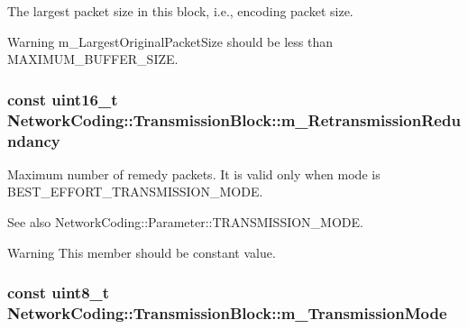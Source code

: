 The largest packet size in this block, i.\+e., encoding packet size. 

\begin{DoxyWarning}{Warning}
m\+\_\+\+Largest\+Original\+Packet\+Size should be less than M\+A\+X\+I\+M\+U\+M\+\_\+\+B\+U\+F\+F\+E\+R\+\_\+\+S\+I\+ZE. 
\end{DoxyWarning}
\subsubsection[{\texorpdfstring{m\+\_\+\+Retransmission\+Redundancy}{m_RetransmissionRedundancy}}]{\setlength{\rightskip}{0pt plus 5cm}const uint16\+\_\+t Network\+Coding\+::\+Transmission\+Block\+::m\+\_\+\+Retransmission\+Redundancy}\hypertarget{class_network_coding_1_1_transmission_block_a1dc8966af67de1e8309b62e3f87854f2}{}\label{class_network_coding_1_1_transmission_block_a1dc8966af67de1e8309b62e3f87854f2}


Maximum number of remedy packets. It is valid only when mode is B\+E\+S\+T\+\_\+\+E\+F\+F\+O\+R\+T\+\_\+\+T\+R\+A\+N\+S\+M\+I\+S\+S\+I\+O\+N\+\_\+\+M\+O\+DE. 

\begin{DoxySeeAlso}{See also}
Network\+Coding\+::\+Parameter\+::\+T\+R\+A\+N\+S\+M\+I\+S\+S\+I\+O\+N\+\_\+\+M\+O\+DE. 
\end{DoxySeeAlso}
\begin{DoxyWarning}{Warning}
This member should be constant value. 
\end{DoxyWarning}
\subsubsection[{\texorpdfstring{m\+\_\+\+Transmission\+Mode}{m_TransmissionMode}}]{\setlength{\rightskip}{0pt plus 5cm}const uint8\+\_\+t Network\+Coding\+::\+Transmission\+Block\+::m\+\_\+\+Transmission\+Mode}\hypertarget{class_network_coding_1_1_transmission_block_a82c18d348f0a5660240e47ee9c9880b1}{}\label{class_network_coding_1_1_transmission_block_a82c18d348f0a5660240e47ee9c9880b1}


